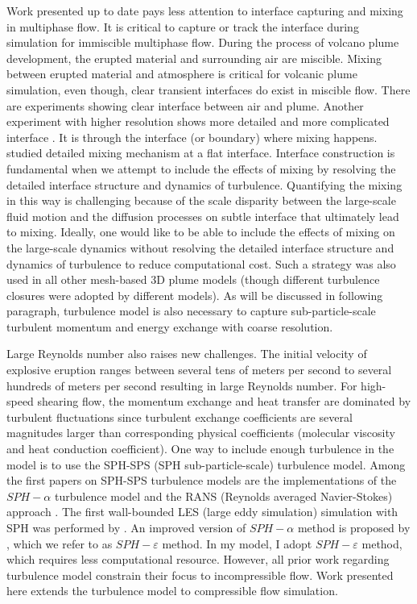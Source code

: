 Work presented up to date pays less attention to interface capturing and mixing in multiphase flow. It is critical to capture or track the interface during simulation for immiscible multiphase flow. During the process of volcano plume development, the erupted material and surrounding air are miscible. Mixing between erupted material and atmosphere is critical for volcanic plume simulation, even though, clear transient interfaces do exist in miscible flow. There are experiments \citep {papantoniou1989large} showing clear interface between air and plume. Another experiment with higher resolution shows more detailed and more complicated interface \cite{crimaldi2001high}. 
It is through the interface (or boundary) where mixing happens. \citet{jacobson2008mixing} studied detailed mixing mechanism at a flat interface. Interface construction is fundamental when we attempt to include the effects of mixing by resolving the detailed interface structure and dynamics of turbulence. Quantifying the mixing in this way is challenging because of the scale disparity between the large-scale fluid motion and the diffusion processes on subtle interface that ultimately lead to mixing. Ideally, one would like to be able to include the effects of mixing on the large-scale dynamics without resolving the detailed interface structure and dynamics of turbulence to reduce computational cost. Such a strategy was also used in all other mesh-based 3D plume models \citep{oberhuber1998volcanic, neri2003multiparticle, suzuki2005numerical, cerminara2016ashee} (though different turbulence closures were adopted by different models). As will be discussed in following paragraph, turbulence model is also necessary to capture sub-particle-scale turbulent momentum and energy exchange with coarse resolution.

Large Reynolds number also raises new challenges.
The initial velocity of explosive eruption ranges between several tens of meters per second to several hundreds of meters per second resulting in large Reynolds number. For high-speed shearing flow, the momentum exchange and heat transfer are dominated by turbulent fluctuations since turbulent exchange coefficients are several magnitudes larger than corresponding physical coefficients (molecular viscosity and heat conduction coefficient). 
One way to include enough turbulence in the model is to use the SPH-SPS (SPH sub-particle-scale) turbulence model.
Among the first papers on SPH-SPS turbulence models are the implementations of the $SPH-\alpha$ turbulence model \citep{holm1999fluctuation, monaghan2002sph} and the RANS (Reynolds averaged Navier-Stokes) approach \citep{violeau2007numerical}. The first wall-bounded LES (large eddy simulation) simulation with SPH was performed by \citet{issa2005numerical}. An improved version of $SPH-\alpha$ method  \citep{monaghan2002sph} is proposed by \citet{monaghan2011turbulence}, which we refer to as $SPH-\varepsilon$ method. In my model, I adopt $SPH-\varepsilon$ method, which requires less computational resource. However, all prior work regarding turbulence model constrain their focus to incompressible flow. Work presented here extends the turbulence model to compressible flow simulation.

